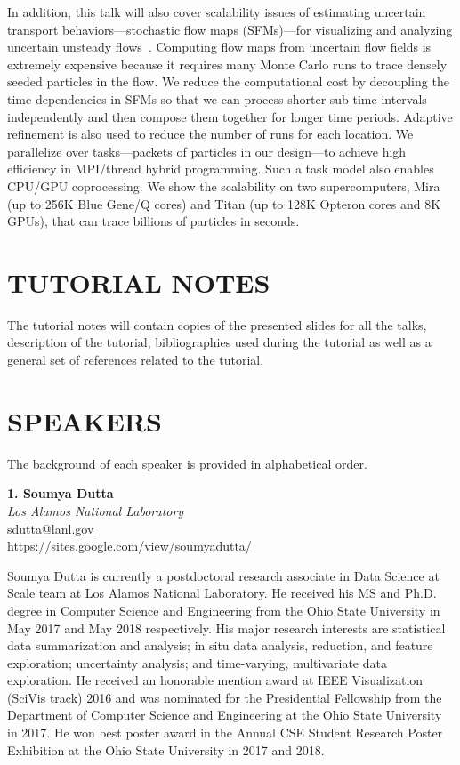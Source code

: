 \documentclass[preprint,journal]{vgtc}       %
\newcommand{\addverticalspace}{\vspace{3mm}}
\begin{document}
In addition, this talk will also cover scalability issues of estimating uncertain transport behaviors---stochastic flow maps (SFMs)---for visualizing and analyzing uncertain unsteady flows~\cite{Guo19}. Computing flow maps from uncertain flow fields is extremely expensive because it requires many Monte Carlo runs to trace densely seeded particles in the flow. We reduce the computational cost by decoupling the time dependencies in SFMs so that we can process shorter sub time intervals independently and then compose them together for longer time periods. Adaptive refinement is also used to reduce the number of runs for each location.  We parallelize over tasks---packets of particles in our design---to achieve high efficiency in MPI/thread hybrid programming. Such a task model also enables CPU/GPU coprocessing. We show the scalability on two supercomputers, Mira (up to 256K Blue Gene/Q cores) and Titan (up to 128K Opteron cores and 8K GPUs), that can trace billions of particles in seconds.


\addverticalspace

\section*{TUTORIAL NOTES}

The tutorial notes will contain copies of the presented slides for all the talks, description of the tutorial,  bibliographies used during the tutorial as well as a general set of references related to the tutorial.

\section*{SPEAKERS}
The background of each speaker is provided in alphabetical order.

\addverticalspace

\noindent \textbf{1. Soumya Dutta}\\
\emph{Los Alamos National Laboratory}\\
\href{mailto:sdutta@lanl.gov}{sdutta@lanl.gov}\\
\url{https://sites.google.com/view/soumyadutta/}

\addverticalspace

Soumya Dutta is currently a postdoctoral research associate in Data Science at Scale team at Los Alamos National Laboratory. He received his MS and Ph.D. degree in Computer Science and Engineering from the Ohio State University in May 2017 and May 2018 respectively. His major research interests are statistical data summarization and analysis; in situ data analysis, reduction, and feature exploration; uncertainty analysis; and time-varying, multivariate data exploration. He received an honorable mention award at IEEE Visualization (SciVis track) 2016 and was nominated for the Presidential Fellowship from the Department of Computer Science and Engineering at the Ohio State University in 2017. He won best poster award in the Annual CSE Student Research Poster Exhibition at the Ohio State University in 2017 and 2018.
\end{document}
